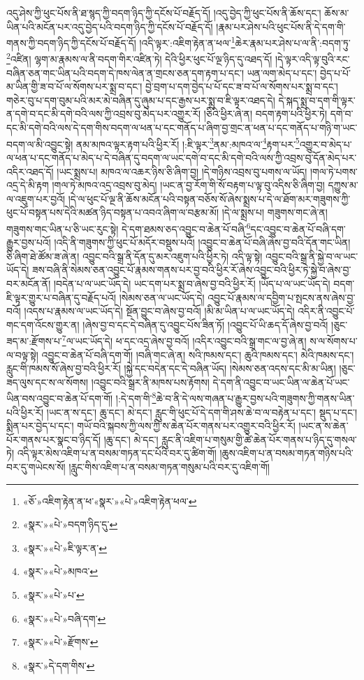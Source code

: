 འདུ་ཤེས་ཀྱི་ཕུང་པོས་ནི་ཐ་སྙད་ཀྱི་བདག་ཉིད་ཀྱི་དངོས་པོ་བརྗོད་དོ། །འདུ་བྱེད་ཀྱི་ཕུང་པོས་ནི་ཆོས་དང་། ཆོས་མ་ཡིན་པའི་མངོན་པར་འདུ་བྱེད་པའི་བདག་ཉིད་ཀྱི་དངོས་པོ་བརྗོད་དོ། །རྣམ་པར་ཤེས་པའི་ཕུང་པོས་ནི་དེ་དག་གི་གནས་ཀྱི་བདག་ཉིད་ཀྱི་དངོས་པོ་བརྗོད་དོ། །འདི་ལྟར་:འཇིག་རྟེན་ན་ཕལ་\footnote{«ཅོ་»འཇིག་རྟེན་ན་ཕ་«སྣར་»«པེ་»འཇིག་རྟེན་ཕལ་}ཆེར་རྣམ་པར་ཤེས་པ་ལ་ནི་:བདག་ཏུ་\footnote{«སྣར་»«པེ་»བདག་ཉིད་དུ་}འཛིན། ལྷག་མ་རྣམས་ལ་ནི་བདག་གིར་འཛིན་ཏེ། དེའི་ཕྱིར་ཕུང་པོ་ལྔ་ཉིད་དུ་འཐད་དོ། །དེ་ལྟར་འདི་ལྟ་བུའི་རང་བཞིན་ཅན་གང་ཡིན་པའི་བདག་དེ་ཁས་ལེན་ན་གྲངས་ཅན་དག་རྟག་པ་དང་། ཡན་ལག་མེད་པ་དང་། བྱེད་པ་པོ་མ་ཡིན་གྱི་ཟ་བ་པོ་ལ་སོགས་པར་སྨྲ་བ་དང་། བྱེ་བྲག་པ་དག་བྱེད་པ་པོ་དང་ཟ་བ་པོ་ལ་སོགས་པར་སྨྲ་བ་དང་། གཅེར་བུ་པ་དག་བུམ་པའི་མར་མེ་བཞིན་དུ་ཞུམ་པ་དང་རྒྱས་པར་སྨྲ་བ་ཇི་ལྟར་འཐད་དེ། དེ་སྐད་སྨྲ་བ་དག་གི་ལྟར་ན་དགེ་བ་དང་མི་དགེ་བའི་ལས་ཀྱི་འབྲས་བུ་མེད་པར་འགྱུར་རོ། །ཅིའི་ཕྱིར་ཞེ་ན། བདག་རྟག་པའི་ཕྱིར་ཏེ། དགེ་བ་དང་མི་དགེ་བའི་ལས་དེ་དག་གིས་བདག་ལ་ཕན་པ་དང་གནོད་པ་ཞིག་བྱ་གྲང་ན་ཕན་པ་དང་གནོད་པ་གཉི་ག་ཡང་བདག་ལ་མི་འབྱུང་སྟེ། ནམ་མཁའ་ལྟར་རྟག་པའི་ཕྱིར་རོ། །:ཇི་ལྟར་\footnote{«སྣར་»«པེ་»ཇི་ལྟར་ན་}ནམ་:མཁའ་ལ་\footnote{«སྣར་»«པེ་»མཁའ་}རྟག་པར་\footnote{«སྣར་»«པེ་»པ་}འགྱུར་བ་མེད་པ་ལ་ཕན་པ་དང་གནོད་པ་མེད་པ་དེ་བཞིན་དུ་བདག་ལ་ཡང་དགེ་བ་དང་མི་དགེ་བའི་ལས་ཀྱི་འབྲས་བུ་དོན་མེད་པར་འདིར་འཐད་དོ། །ཡང་སྨྲས་པ། མཁའ་ལ་འཆར་ཉིས་ཅི་ཞིག་བྱ། །དེ་གཉིས་འབྲས་བུ་པགས་ལ་ཡོད། །གལ་ཏེ་པགས་འདྲ་དེ་མི་རྟག །གལ་ཏེ་མཁའ་འདྲ་འབྲས་བུ་མེད། །ཡང་ན་བྱ་རོག་གི་སོ་བརྟག་པ་ལྟ་བུ་འདིས་ཅི་ཞིག་བྱ། དཀྱུས་མ་ལ་འཇུག་པར་བྱའོ། །དེ་ལ་ཕུང་པོ་ལྔ་ནི་ཆོས་མངོན་པའི་བསྟན་བཅོས་སོ་ཞེས་སྨྲས་པ་དེ་ལ་ཐོག་མར་གཟུགས་ཀྱི་ཕུང་པོ་བསྟན་པས་དེའི་མཚན་ཉིད་བསྟན་པ་འབའ་ཞིག་ལ་བརྩམ་མོ། །དེ་ལ་སྨྲས་པ། གཟུགས་གང་ཞེ་ན། གཟུགས་གང་ཡིན་པ་ཅི་ཡང་རུང་སྟེ། དེ་དག་ཐམས་ཅད་འབྱུང་བ་ཆེན་པོ་བཞི་\footnote{«སྣར་»«པེ་»བཞི་དག་}དང་འབྱུང་བ་ཆེན་པོ་བཞི་དག་རྒྱུར་བྱས་པའོ། །འདི་ནི་གཟུགས་ཀྱི་ཕུང་པོ་མདོར་བསྡུས་པའོ། །འབྱུང་བ་ཆེན་པོ་བཞི་ཞེས་བྱ་བའི་དོན་གང་ཡིན། ཅི་ཞིག་ཐེ་ཚོམ་ཟ་ཞེ་ན། འབྱུང་བའི་སྒྲ་ནི་དོན་དུ་མར་འཇུག་པའི་ཕྱིར་ཏེ། འདི་ལྟ་སྟེ། འབྱུང་བའི་སྒྲ་ནི་སྐྱེ་བ་ལ་ཡང་ཡོད་དེ། ཟས་བཞི་ནི་སེམས་ཅན་འབྱུང་པོ་རྣམས་གནས་པར་བྱ་བའི་ཕྱིར་རོ་ཞེས་འབྱུང་བའི་ཕྱིར་ཏེ་སྐྱེ་བ་ཞེས་བྱ་བར་མངོན་ནོ། །བདེན་པ་ལ་ཡང་ཡོད་དེ། ཡང་དག་པར་སྨྲ་བ་ཞེས་བྱ་བའི་ཕྱིར་རོ། །ཡོད་པ་ལ་ཡང་ཡོད་དེ། བདག་ཇི་ལྟར་གྱུར་པ་བཞིན་དུ་བརྗོད་པའོ། །སེམས་ཅན་ལ་ཡང་ཡོད་དེ། འབྱུང་པོ་རྣམས་ལ་དབྱིག་པ་སྤངས་ནས་ཞེས་བྱ་བའོ། །འདས་པ་རྣམས་ལ་ཡང་ཡོད་དེ། སྔོན་བྱུང་བ་ཞེས་བྱ་བའོ། །མི་མ་ཡིན་པ་ལ་ཡང་ཡོད་དེ། འདིར་ནི་འབྱུང་པོ་གང་དག་འོངས་གྱུར་ན། །ཞེས་བྱ་བ་དང་དེ་བཞིན་དུ་འབྱུང་པོས་ཟིན་ཏོ། །འབྱུང་པོ་ཡི་ཆད་དོ་ཞེས་བྱ་བའོ། །ཅུང་ཟད་མ་:རྫོགས་པ་\footnote{«སྣར་»«པེ་»རྫོགས་}ལ་ཡང་ཡོད་དེ། ཕ་དང་འདྲ་ཞེས་བྱ་བའོ། །འདིར་འབྱུང་བའི་སྒྲ་གང་ལ་བྱ་ཞེ་ན། ས་ལ་སོགས་པ་ལ་བལྟ་སྟེ། འབྱུང་བ་ཆེན་པོ་བཞི་དག་གོ། །བཞི་གང་ཞེ་ན། སའི་ཁམས་དང་། ཆུའི་ཁམས་དང་། མེའི་ཁམས་དང་། རླུང་གི་ཁམས་སོ་ཞེས་བྱ་བའི་ཕྱིར་རོ། །སྐྱེ་དང་བདེན་དང་དེ་བཞིན་ཡོད། །སེམས་ཅན་འདས་དང་མི་མ་ཡིན། །ཅུང་ཟད་ལུས་དང་ས་ལ་སོགས། །འབྱུང་བའི་སྒྲར་ནི་མཁས་པས་རྟོགས། དེ་དག་ནི་འབྱུང་བ་ཡང་ཡིན་ལ་ཆེན་པོ་ཡང་ཡིན་བས་འབྱུང་བ་ཆེན་པོ་དག་གོ། །:དེ་དག་གི་\footnote{«སྣར་»དེ་དག་གིས་}ཆེ་བ་ནི་དེ་ལས་གཞན་པ་རྒྱུར་བྱས་པའི་གཟུགས་ཀྱི་གནས་ཡིན་པའི་ཕྱིར་རོ། །ཡང་ན་ས་དང་། ཆུ་དང་། མེ་དང་། རླུང་གི་ཕུང་པོ་དེ་དག་གི་ཤས་ཆེ་བ་ལ་བརྟེན་པ་དང་། སྡུད་པ་དང་། སྨིན་པར་བྱེད་པ་དང་། གཡོ་བའི་སྐབས་ཀྱི་ལས་ཀྱི་ས་ཆེན་པོར་གནས་པར་འགྱུར་བའི་ཕྱིར་རོ། །ཡང་ན་ས་ཆེན་པོར་གནས་པར་སྣང་བ་ཉིད་དོ། །ཆུ་དང་། མེ་དང་། རླུང་ནི་འཇིག་པ་གསུམ་གྱི་ཚེ་ཆེན་པོར་གནས་པ་ཉིད་དུ་གསལ་ཏེ། འདི་ལྟར་མེས་འཇིག་པ་ན་བསམ་གཏན་དང་པོའི་བར་དུ་ཚིག་གོ། །ཆུས་འཇིག་པ་ན་བསམ་གཏན་གཉིས་པའི་བར་དུ་གཡེངས་སོ། །རླུང་གིས་འཇིག་པ་ན་བསམ་གཏན་གསུམ་པའི་བར་དུ་འཇིག་གོ། 